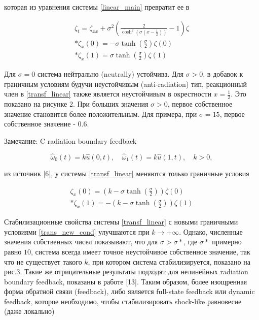 которая из уравнения системы \eqref{linear_main} превратит ее в 

\begin{gather} \label{transf_linear}
  \zeta_t = \zeta_{xx} + \sigma^2(\frac{2}{\cosh^2(\sigma(x - \frac{1}{2}))} - 1)\zeta \\* 
  \zeta_x(0) = -\sigma\tanh(\frac{\sigma}{2})\zeta(0) \\* 
  \zeta_x(1) = \sigma\tanh(\frac{\sigma}{2})\zeta(1)
\end{gather}

Для $\sigma = 0$ система нейтрально (neutrally) устойчива. Для $\sigma > 0$, в добавок к граничным условиям будучи неустойчивым (anti-radiation) тип, реакционный член в \eqref{transf_linear} также является неустойчивым в окрестности $x = \frac{1}{2}$. Это показано на рисунке 2. При больших значения $\sigma > 0$, первое собственное значение становится более положительным. Для примера, при $\sigma = 15$, первое собственное значение - $0.6$.

Замечание: C radiation boundary feedback

\begin{equation}\label{radiation_feedback}
  \hat{\omega}_0(t) = k\hat{u}(0, t), \quad \hat{\omega}_1(t) = k\hat{u}(1, t), \quad k > 0,  
\end{equation} 

из источник [6], у системы \eqref{transf_linear} меняются только граничные условия

\begin{gather}\label{trans_new_cond}
  \zeta_x(0) = (k - \sigma\tanh(\frac{\sigma}{2}))\zeta(0) \\* 
  \zeta_x(1) = -(k - \sigma\tanh(\frac{\sigma}{2}))\zeta(1)
\end{gather}

Стабилизационные свойства системы \eqref{transf_linear} с новыми граничными условиями \eqref{trans_new_cond} улучшаются при $k \rightarrow +\infty$. Однако, численные значения собственных чисел показывают, что для $\sigma > \sigma*$, где $\sigma*$ примерно равно $10$, система всегда имеет точное неустойчивое собственное значение, так что не существует такого $k$, при котором система стабилизируется, показано на рис.3. Такие же отрицательные результаты подходят для нелинейных radiation boundary feedback, показаны в работе [13]. Таким образом, более изощренная форма обратной связи (feedback), либо является full-state feedback или dynamic feedback, которое необходимо, чтобы стабилизировать shock-like равновесие (даже локально)


